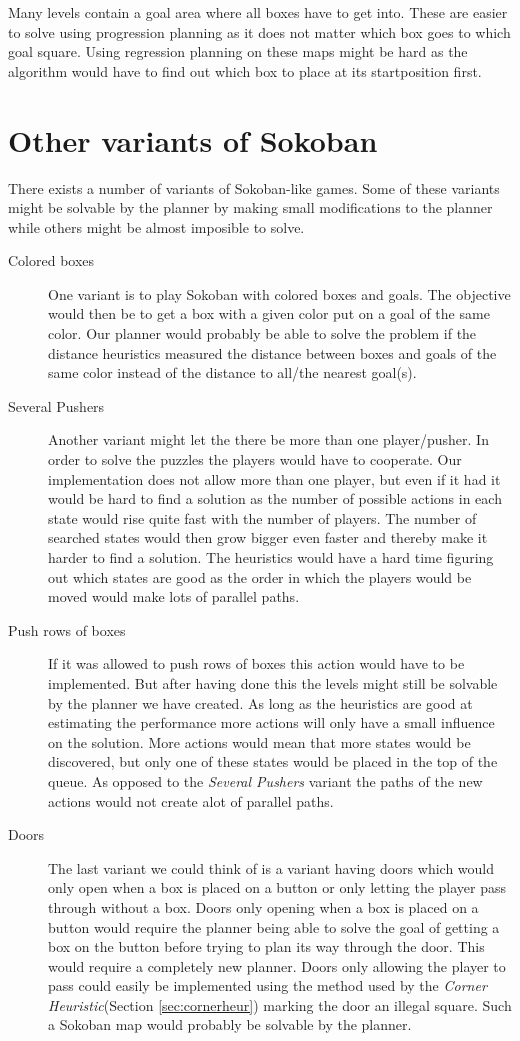 Many levels contain a goal area where all boxes have to get into. These are easier to solve using progression planning as it does not matter which box goes to which goal square. Using regression planning on these maps might be hard as the algorithm would have to find out which box to place at its startposition first.

\section{Other variants of Sokoban}
There exists a number of variants of Sokoban-like games. Some of these variants might be solvable by the planner by making small modifications to the planner while others might be almost imposible to solve.

\begin{description}
\item[Colored boxes] One variant is to play Sokoban with colored boxes and goals. The objective would then be to get a box with a given color put on a goal of the same color. Our planner would probably be able to solve the problem if the distance heuristics measured the distance between boxes and goals of the same color instead of the distance to all/the nearest goal(s).
\item[Several Pushers] Another variant might let the there be more than one player/pusher. In order to solve the puzzles the players would have to cooperate. Our implementation does not allow more than one player, but even if it had it would be hard to find a solution as the number of possible actions in each state would rise quite fast with the number of players. The number of searched states would then grow bigger even faster and thereby make it harder to find a solution. The heuristics would have a hard time figuring out which states are good as the order in which the players would be moved would make lots of parallel paths.
\item[Push rows of boxes] If it was allowed to push rows of boxes this action would have to be implemented. But after having done this the levels might still be solvable by the planner we have created. As long as the heuristics are good at estimating the performance more actions will only have a small influence on the solution. More actions would mean that more states would be discovered, but only one of these states would be placed in the top of the queue. As opposed to the \textit{Several Pushers} variant the paths of the new actions would not create alot of parallel paths.
\item[Doors] The last variant we could think of is a variant having doors which would only open when a box is placed on a button or only letting the player pass through without a box. Doors only opening when a box is placed on a button would require the planner being able to solve the goal of getting a box on the button before trying to plan its way through the door. This would require a completely new planner. Doors only allowing the player to pass could easily be implemented using the method used by the \textit{Corner Heuristic}(Section \ref{sec:cornerheur}) marking the door an illegal square. Such a Sokoban map would probably be solvable by the planner.
\end{description}
